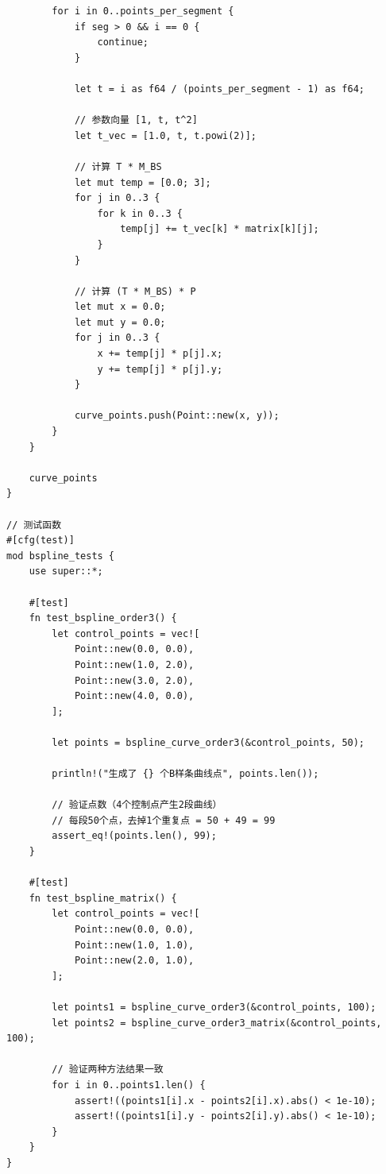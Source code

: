 \documentclass[12pt,a4paper]{article}
\begin{document}
\begin{lstlisting}
        for i in 0..points_per_segment {
            if seg > 0 && i == 0 {
                continue;
            }
            
            let t = i as f64 / (points_per_segment - 1) as f64;
            
            // 参数向量 [1, t, t^2]
            let t_vec = [1.0, t, t.powi(2)];
            
            // 计算 T * M_BS
            let mut temp = [0.0; 3];
            for j in 0..3 {
                for k in 0..3 {
                    temp[j] += t_vec[k] * matrix[k][j];
                }
            }
            
            // 计算 (T * M_BS) * P
            let mut x = 0.0;
            let mut y = 0.0;
            for j in 0..3 {
                x += temp[j] * p[j].x;
                y += temp[j] * p[j].y;
            }
            
            curve_points.push(Point::new(x, y));
        }
    }
    
    curve_points
}

// 测试函数
#[cfg(test)]
mod bspline_tests {
    use super::*;
    
    #[test]
    fn test_bspline_order3() {
        let control_points = vec![
            Point::new(0.0, 0.0),
            Point::new(1.0, 2.0),
            Point::new(3.0, 2.0),
            Point::new(4.0, 0.0),
        ];
        
        let points = bspline_curve_order3(&control_points, 50);
        
        println!("生成了 {} 个B样条曲线点", points.len());
        
        // 验证点数（4个控制点产生2段曲线）
        // 每段50个点，去掉1个重复点 = 50 + 49 = 99
        assert_eq!(points.len(), 99);
    }
    
    #[test]
    fn test_bspline_matrix() {
        let control_points = vec![
            Point::new(0.0, 0.0),
            Point::new(1.0, 1.0),
            Point::new(2.0, 1.0),
        ];
        
        let points1 = bspline_curve_order3(&control_points, 100);
        let points2 = bspline_curve_order3_matrix(&control_points, 100);
        
        // 验证两种方法结果一致
        for i in 0..points1.len() {
            assert!((points1[i].x - points2[i].x).abs() < 1e-10);
            assert!((points1[i].y - points2[i].y).abs() < 1e-10);
        }
    }
}
\end{lstlisting}
\end{document}
